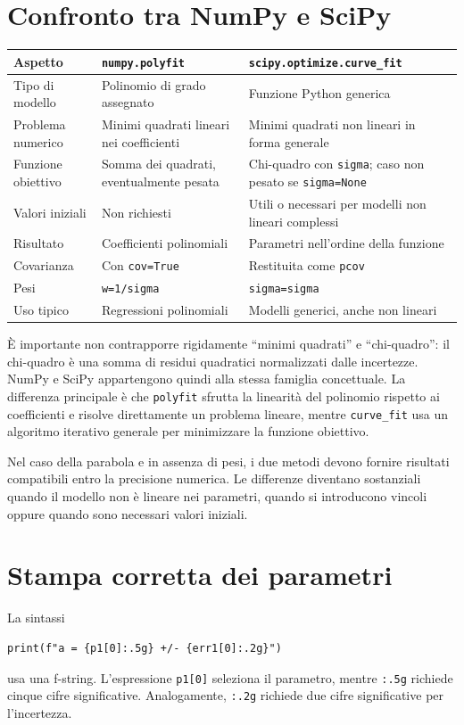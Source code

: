 \documentclass[11pt,a4paper]{book}
\begin{document}
\section{Confronto tra NumPy e SciPy}
\begin{center}
\begin{tabular}{p{}p{}p{}}
\toprule
Aspetto & \texttt{numpy.polyfit} & \texttt{scipy.optimize.curve\_fit}\\
\midrule
Tipo di modello & Polinomio di grado assegnato & Funzione Python generica\\
Problema numerico & Minimi quadrati lineari nei coefficienti & Minimi quadrati non lineari in forma generale\\
Funzione obiettivo & Somma dei quadrati, eventualmente pesata & Chi-quadro con \texttt{sigma}; caso non pesato se \texttt{sigma=None}\\
Valori iniziali & Non richiesti & Utili o necessari per modelli non lineari complessi\\
Risultato & Coefficienti polinomiali & Parametri nell'ordine della funzione\\
Covarianza & Con \texttt{cov=True} & Restituita come \texttt{pcov}\\
Pesi & \texttt{w=1/sigma} & \texttt{sigma=sigma}\\
Uso tipico & Regressioni polinomiali & Modelli generici, anche non lineari\\
\bottomrule
\end{tabular}
\end{center}

È importante non contrapporre rigidamente ``minimi quadrati'' e ``chi-quadro'': il chi-quadro è una somma di residui quadratici normalizzati dalle incertezze. NumPy e SciPy appartengono quindi alla stessa famiglia concettuale. La differenza principale è che \texttt{polyfit} sfrutta la linearità del polinomio rispetto ai coefficienti e risolve direttamente un problema lineare, mentre \texttt{curve\_fit} usa un algoritmo iterativo generale per minimizzare la funzione obiettivo.

Nel caso della parabola e in assenza di pesi, i due metodi devono fornire risultati compatibili entro la precisione numerica. Le differenze diventano sostanziali quando il modello non è lineare nei parametri, quando si introducono vincoli oppure quando sono necessari valori iniziali.

\section{Stampa corretta dei parametri}
La sintassi
\begin{lstlisting}
print(f"a = {p1[0]:.5g} +/- {err1[0]:.2g}")
\end{lstlisting}
usa una f-string. L'espressione \texttt{p1[0]} seleziona il parametro, mentre \texttt{:.5g} richiede cinque cifre significative. Analogamente, \texttt{:.2g} richiede due cifre significative per l'incertezza.
\end{document}
